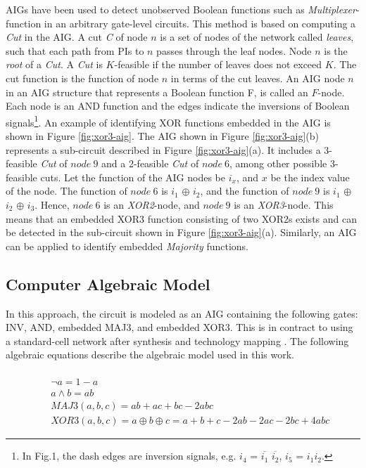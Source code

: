 AIGs have been used to detect unobserved Boolean functions such as \textit{Multiplexer}-function \cite{cunxiyu:dac16} in an arbitrary gate-level circuits. This method is based on computing a \textit{Cut} in the AIG. A cut \textit{C} of node $n$ is a set of nodes of the network called \textit{leaves}, such that each path from PIs to $n$ passes through the leaf nodes. Node $n$ is the \textit{root} of a \textit{Cut}. A \textit{Cut} is $K$-feasible if the number of leaves does not exceed $K$. The cut function is the function of node $n$ in terms of the cut leaves. An AIG node $n$ in an AIG structure that represents a Boolean function F, is called an $F$-node. Each node is an AND function and the edges indicate the inversions of Boolean signals\footnote{In Fig.1, the dash edges are inversion signals, e.g. $i_4$ = $\overline{i_1}$  $\overline{i_2}$, $i_5$ = $i_1$$i_2$.}. 
%
An example of identifying XOR functions embedded in the AIG is shown in Figure \ref{fig:xor3-aig}. The AIG shown in Figure \ref{fig:xor3-aig}(b) represents a sub-circuit described in Figure \ref{fig:xor3-aig}(a). It includes a 3-feasible \textit{Cut} of $node~9$ and a 2-feasible \textit{Cut} of $node~6$, among other possible 3-feasible cuts. Let the function of the AIG nodes be $i_{x}$, and $x$ be the index value of the node. 
The function of $node~6$ is $i_1$ $\oplus$ $i_2$, and the function of $node~9$ is $i_1$ $\oplus$ $i_2$ $\oplus$ $i_3$. Hence, $node~6$ is an \textit{XOR2}-node, and $node~9$ is an \textit{XOR3}-node. This means that an embedded XOR3 function consisting of two XOR2s exists and can be detected in the sub-circuit shown in Figure \ref{fig:xor3-aig}(a). Similarly, an AIG can be applied to identify embedded \textit{Majority} functions.


\subsection{Computer Algebraic Model}

In this approach, the circuit is modeled as an AIG containing the following gates: INV, AND, embedded MAJ3, and embedded XOR3. This is in contract to using a standard-cell network after synthesis and technology mapping \cite{ciesielski2015verification}. The following algebraic equations describe the algebraic model used in this work.

{\small
\vspace{-4mm}
\begin{equation}
     \begin{aligned}
      \text{~~} &\\
       & \neg a = 1 - a \\
       & a \wedge b = ab \\
       & MAJ3(a, b, c) = ab+ac+bc - 2abc \\
       & XOR3(a, b, c) = a \oplus b \oplus c  = a + b + c - 2ab - 2ac - 2bc + 4abc
     \end{aligned}
\label{eq:boolean-poly}
\end{equation}
}

